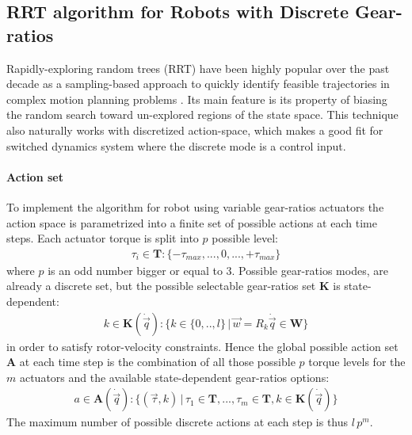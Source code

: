 \subsection{RRT algorithm for Robots with Discrete Gear-ratios}

Rapidly-exploring random trees (RRT) have been highly popular over the past decade as a sampling-based approach to quickly identify feasible trajectories in complex motion planning problems \cite{lavalle_rapidly-exploring_1998}\cite{lavalle_planning_2006}. Its main feature is its property of biasing the random search toward un-explored regions of the state space. This technique also naturally works with discretized action-space, which makes a good fit for switched dynamics system where the discrete mode is a control input.


\paragraph{Action set}
%
To implement the algorithm for robot using variable gear-ratios actuators the action space is parametrized into a finite set of possible actions at each time steps. Each actuator torque is split into $p$ possible level:
%
\begin{align}
\tau_i  \in \boldsymbol{T} : \{ -\tau_{max} , ... , 0 , ... , +\tau_{max} \}
\end{align}
%
where $p$ is an odd number bigger or equal to 3. Possible gear-ratios modes, are already a discrete set, but the possible selectable gear-ratios set $\boldsymbol{K}$ is state-dependent:
%
\begin{align}
k \in \boldsymbol{K}(\dot{\vec{q}}) : \big\{ k \in \{0,..,l\} \,|\, \vec{w} = R_k \dot{\vec{q}} \in \boldsymbol{W} \big\}
\end{align}
%
in order to satisfy rotor-velocity constraints. Hence the global possible action set $\boldsymbol{A}$ at each time step is the combination of all those possible $p$ torque levels for the $m$ actuators and the available state-dependent gear-ratios options:
%
\begin{align}
a \in \boldsymbol{A}(\dot{\vec{q}}) : \big\{ \left( \vec{\tau} , k \right) \,|\, \tau_1  \in \boldsymbol{T}  , ...  ,  \tau_m  \in \boldsymbol{T} ,  k \in \boldsymbol{K}(\dot{\vec{q}})  \big\}
\end{align}
%
The maximum number of possible discrete actions at each step is thus $l\,p^m$.


